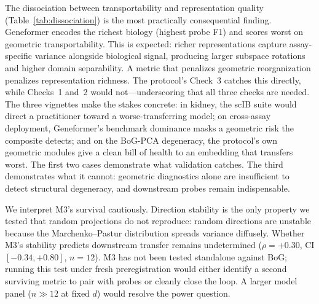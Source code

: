 \documentclass[9pt,lineno]{elife}
\begin{document}
The dissociation between transportability and representation quality (Table~\ref{tab:dissociation}) is the most practically consequential finding. Geneformer encodes the richest biology (highest probe F1) and scores worst on geometric transportability. This is expected: richer representations capture assay-specific variance alongside biological signal, producing larger subspace rotations and higher domain separability. A metric that penalizes geometric reorganization penalizes representation richness. The protocol's Check~3 catches this directly, while Checks~1 and~2 would not---underscoring that all three checks are needed. The three vignettes make the stakes concrete: in kidney, the scIB suite would direct a practitioner toward a worse-transferring model; on cross-assay deployment, Geneformer's benchmark dominance masks a geometric risk the composite detects; and on the BoG-PCA degeneracy, the protocol's own geometric modules give a clean bill of health to an embedding that transfers worst. The first two cases demonstrate what validation catches. The third demonstrates what it cannot: geometric diagnostics alone are insufficient to detect structural degeneracy, and downstream probes remain indispensable.

We interpret M3's survival cautiously. Direction stability is the only property we tested that random projections do not reproduce: random directions are unstable because the Marchenko--Pastur distribution spreads variance diffusely. Whether M3's stability predicts downstream transfer remains undetermined ($\rho = +0.30$, CI $[-0.34, +0.80]$, $n = 12$). M3 has not been tested standalone against BoG; running this test under fresh preregistration would either identify a second surviving metric to pair with probes or cleanly close the loop. A larger model panel ($n \gg 12$ at fixed $d$) would resolve the power question.
\end{document}
